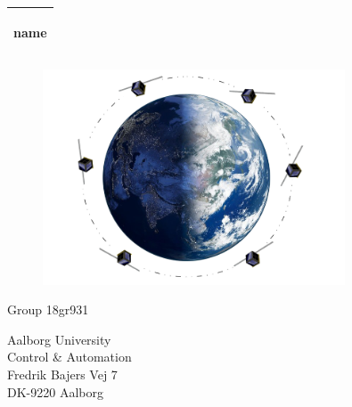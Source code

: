 %
\begin{titlepage}
  \addtolength{\hoffset}{0.5\evensidemargin-0.5\oddsidemargin} %
  \noindent%
  \begin{tabular}{@{}p{\textwidth}@{}}
    \toprule[2pt]
    \midrule
    \vspace{0.2cm}
    \begin{center}
    \Huge{\textbf{
      name%
    }}
    \end{center}
%
    \vspace{0.2cm}\\
    \midrule
    \toprule[2pt]
  \end{tabular}
   \vspace{0.55 cm}
  \begin{figure}[!ht]
\centering
\includegraphics[width=0.8\textwidth]{figures/c1}
\label{fig:forside}
\end{figure}
  \vspace{0.6 cm}
  \begin{center}
    \vspace{0.2cm}
    {\Large
      Group 18gr931%
    }
  \end{center}
  \begin{center}
  Aalborg University\\
  Control \& Automation\\
  Fredrik Bajers Vej 7\\
  DK-9220 Aalborg
  \end{center}
\end{titlepage}

\clearpage